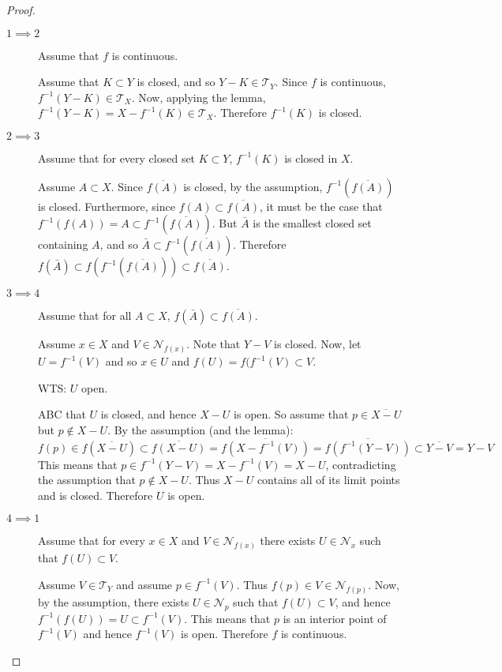 \documentclass[letterpaper,12pt,fleqn]{article}
\newcommand{\T}{\mathscr{T}}
\renewcommand{\N}{\mathcal{N}}
\begin{document}
\begin{proof}
  \begin{description}
  \item[]
  \item[\(1\implies2\)] Assume that \(f\) is continuous.

    Assume that \(K\subset Y\) is closed, and so \(Y-K\in\T_Y\).  Since \(f\) is continuous,
    \(f^{-1}(Y-K)\in\T_X\).  Now, applying the lemma, \(f^{-1}(Y-K)=X-f^{-1}(K)\in\T_X\).  Therefore
    \(f^{-1}(K)\) is closed.

  \item[\(2\implies3\)] Assume that for every closed set \(K\subset Y\), \(f^{-1}(K)\) is closed in \(X\).

    Assume \(A\subset X\).  Since \(\overline{f(A)}\) is closed, by the assumption, \(f^{-1}(\overline{f(A)})\) is
    closed.  Furthermore, since \(f(A)\subset\overline{f(A)}\), it must be the case that
    \(f^{-1}(f(A))=A\subset f^{-1}(\overline{f(A)})\).  But \(\bar{A}\) is the smallest closed set containing \(A\),
    and so \(\bar{A}\subset f^{-1}(\overline{f(A)})\).
    Therefore \(f(\bar{A})\subset f(f^{-1}(\overline{f(A)}))\subset\overline{f(A)}\).

  \item[\(3\implies4\)] Assume that for all \(A\subset X\), \(f(\bar{A})\subset\overline{f(A)}\).

    Assume \(x\in X\) and \(V\in\N_{f(x)}\).  Note that \(Y-V\) is closed.  Now, let \(U=f^{-1}(V)\) and so
    \(x\in U\) and \(f(U)=f(f^{-1}(V)\subset V\).

    WTS: \(U\) open.

    ABC that \(U\) is closed, and hence \(X-U\) is open.  So assume that \(p\in\overline{X-U}\) but
    \(p\notin X-U\).  By the assumption (and the lemma):
    \[f(p)\in f(\overline{X-U})\subset\overline{f(X-U)}=\overline{f(X-f^{-1}(V))}=\overline{f(f^{-1}(Y-V))}\subset
    \overline{Y-V}=Y-V\]
    This means that \(p\in f^{-1}(Y-V)=X-f^{-1}(V)=X-U\), contradicting the assumption that \(p\notin X-U\).
    Thus \(X-U\) contains all of its limit points and is closed.  Therefore \(U\) is open.

  \item[\(4\implies1\)] Assume that for every \(x\in X\) and \(V\in\N_{f(x)}\) there exists \(U\in\N_x\) such that
    \(f(U)\subset V\).

    Assume \(V\in\T_Y\) and assume \(p\in f^{-1}(V)\).  Thus \(f(p)\in V\in\N_{f(p)}\).  Now, by the assumption,
    there exists \(U\in\N_p\) such that \(f(U)\subset V\), and hence \(f^{-1}(f(U))=U\subset f^{-1}(V)\).  This
    means that \(p\) is an interior point of \(f^{-1}(V)\) and hence \(f^{-1}(V)\) is open.  Therefore \(f\) is
    continuous.
  \end{description}
\end{proof}
\end{document}

